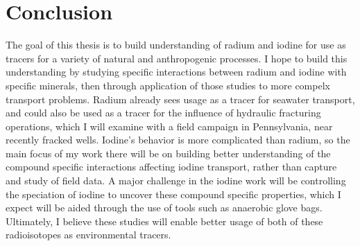 \documentclass[twoside,12pt,titlepage]{article}
\begin{document}
\section{Conclusion}

The goal of this thesis is to build understanding of radium and iodine for use as tracers for a variety of natural and anthropogenic processes. I hope to build this understanding by studying specific interactions between radium and iodine with specific minerals, then through application of those studies to more compelx transport problems. Radium already sees usage as a tracer for seawater transport, and could also be used as a tracer for the influence of hydraulic fracturing operations, which I will examine with a field campaign in Pennsylvania, near recently fracked wells. Iodine's behavior is more complicated than radium, so the main focus of my work there will be on building better understanding of the compound specific interactions affecting iodine transport, rather than capture and study of field data. A major challenge in the iodine work will be controlling the speciation of iodine to uncover these compound specific properties, which I expect will be aided through the use of tools such as anaerobic glove bags. Ultimately, I believe these studies will enable better usage of both of these radioisotopes as environmental tracers.



\end{document}
